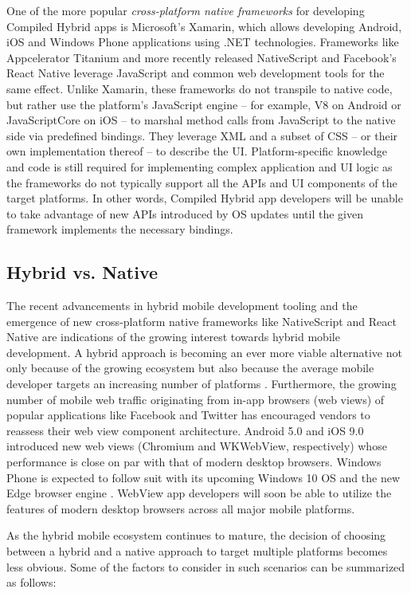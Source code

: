 \documentclass[thesis.tex]{subfiles}
\begin{document}
One of the more popular \textit{cross-platform native frameworks} for developing Compiled Hybrid apps is Microsoft's Xamarin, which allows developing Android, iOS and Windows Phone applications using .NET technologies. Frameworks like Appcelerator Titanium and more recently released NativeScript and Facebook's React Native leverage JavaScript and common web development tools for the same effect. Unlike Xamarin, these frameworks do not transpile to native code, but rather use the platform's JavaScript engine -- for example, V8 on Android or JavaScriptCore on iOS -- to marshal method calls from JavaScript to the native side via predefined bindings. They leverage XML and a subset of CSS -- or their own implementation thereof -- to describe the UI. Platform-specific knowledge and code is still required for implementing complex application and UI logic as the frameworks do not typically support all the APIs and UI components of the target platforms. In other words, Compiled Hybrid app developers will be unable to take advantage of new APIs introduced by OS updates until the given framework implements the necessary bindings.

\subsection{Hybrid vs. Native}

The recent advancements in hybrid mobile development tooling and the emergence of new cross-platform native frameworks like NativeScript and React Native are indications of the growing interest towards hybrid mobile development. A hybrid approach is becoming an ever more viable alternative not only because of the growing ecosystem but also because the average mobile developer targets an increasing number of platforms \cite{two_platforms}. Furthermore, the growing number of mobile web traffic originating from in-app browsers (web views) of popular applications like Facebook and Twitter has encouraged vendors to reassess their web view component architecture. Android 5.0 and iOS 9.0 introduced new web views (Chromium and WKWebView, respectively) whose performance is close on par with that of modern desktop browsers. \cite{souders_webview} Windows Phone is expected to follow suit with its upcoming Windows 10 OS and the new Edge browser engine \cite{spartan}. WebView app developers will soon be able to utilize the features of modern desktop browsers across all major mobile platforms.

As the hybrid mobile ecosystem continues to mature, the decision of choosing between a hybrid and a native approach to target multiple platforms becomes less obvious. Some of the factors to consider in such scenarios can be summarized as follows:
\end{document}
